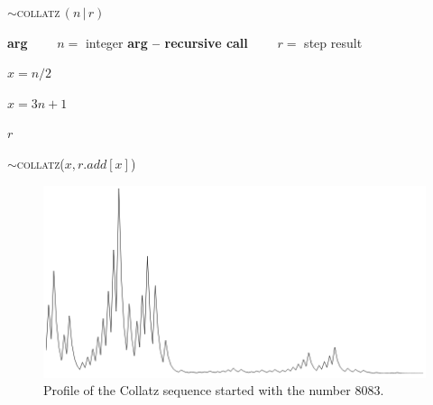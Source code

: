 \smallskip

\begin{algorithm}
\caption{$\sim$\textsc{collatz}$\,(n \,|\, r)$}\label{collatz}
\begin{algorithmic}%

\State \textbf{arg}
\State $\qquad n=$ integer
\State \textbf{arg -- recursive call}
\State $\qquad r=$ step result
\State


$x=n/2$

\Else 

$x=3n+1$
\EndIf
\State
{} 

\Return $r$

\Else

$\sim$\textsc{collatz}($x,r.add[x]$)
\EndIf

\end{algorithmic}
\end{algorithm}

\begin{figure}[H]
\begin{center}
\includegraphics[scale=0.46]{img/8083.png}
\caption{Profile of the Collatz sequence started with the number 8083.}
\label{coltz}
\end{center}
\end{figure}



